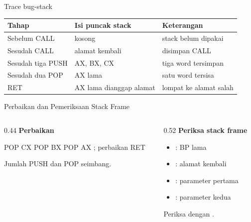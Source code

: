 \documentclass[aspectratio=169,11pt]{beamer}
\begin{document}
\begin{frame}{Trace bug-stack}
\footnotesize
\begin{center}
\begin{tabular}{@{}>{\raggedright\arraybackslash}p{4.0cm}
    >{\raggedright\arraybackslash}p{3.8cm}
    >{\raggedright\arraybackslash}p{4.8cm}@{}}
    \toprule
    \textbf{Tahap} & \textbf{Isi puncak stack} & \textbf{Keterangan} \\
    \midrule
    Sebelum CALL & kosong & stack belum dipakai \\
    \addlinespace
    Sesudah CALL & alamat kembali & disimpan CALL \\
    \addlinespace
    Sesudah tiga PUSH & AX, BX, CX & tiga word tersimpan \\
    \addlinespace
    Sesudah dua POP & AX lama & satu word tersisa \\
    \addlinespace
    RET & AX lama dianggap alamat & lompat ke alamat salah \\
    \bottomrule
\end{tabular}
\end{center}
\end{frame}

\begin{frame}[fragile]{Perbaikan dan Pemeriksaan Stack Frame}
\begin{columns}[t]
\begin{column}{0.44\textwidth}
{\color{obeTeal}\bfseries Perbaikan}\\[0.15em]
\begin{kodeasm}[numbers=none]
POP CX
POP BX
POP AX          ; perbaikan
RET
\end{kodeasm}

\vspace{0.2em}
{\footnotesize Jumlah PUSH dan POP seimbang.\par}
\end{column}
\begin{column}{0.52\textwidth}
{\color{obeTeal}\bfseries Periksa stack frame}\\[0.15em]
\begin{itemize}\footnotesize
    \item \code{[BP+0]}: BP lama
    \item \code{[BP+2]}: alamat kembali
    \item \code{[BP+4]}: parameter pertama
    \item \code{[BP+6]}: parameter kedua
\end{itemize}

\vspace{0.2em}
{\footnotesize\color{obeGray}Periksa dengan .\par}
\end{column}
\end{columns}
\end{frame}
\end{document}
